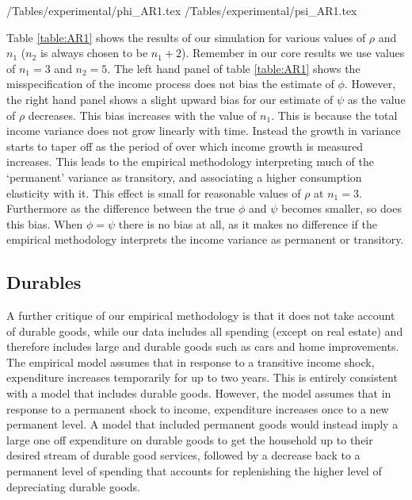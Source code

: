 \documentclass[titlepage]{\econtex}\newcommand{\texname}{IncomeUncertainty}
\begin{document}
\begin{center}
	\econtexRoot/Tables/experimental/phi_AR1.tex	
	\econtexRoot/Tables/experimental/psi_AR1.tex		
	\label{table:AR1}
\end{center}

Table \ref{table:AR1} shows the results of our simulation for various values of $\rho$ and $n_1$ ($n_2$ is always chosen to be $n_1+2$). Remember in our core results we use values of $n_1=3$ and $n_2=5$. The left hand panel of table \ref{table:AR1} shows the misspecification of the income process does not bias the estimate of $\phi$. However, the right hand panel shows a slight upward bias for our estimate of $\psi$ as the value of $\rho$ decreases. This bias increases with the value of $n_1$. This is because the total income variance does not grow linearly with time. Instead the growth in variance starts to taper off as the period of over which income growth is measured increases. This leads to the empirical methodology interpreting much of the `permanent' variance as transitory, and associating a higher consumption elasticity with it. This effect is small for reasonable values of $\rho$ at $n_1=3$. Furthermore as the difference between the true $\phi$ and $\psi$ becomes smaller, so does this bias. When $\phi=\psi$ there is no bias at all, as it makes no difference if the empirical methodology interprets the income variance as permanent or transitory.

\subsection{Durables}
A further critique of our empirical methodology is that it does not take account of durable goods, while our data includes all spending (except on real estate) and therefore includes large and durable goods such as cars and home improvements. The empirical model assumes that in response to a transitive income shock, expenditure increases temporarily for up to two years. This is entirely consistent with a model that includes durable goods. However, the model assumes that in response to a permanent shock to income, expenditure increases once to a new permanent level. A model that included permanent goods would instead imply a large one off expenditure on durable goods to get the household up to their desired stream of durable good services, followed by a decrease back to a permanent level of spending that accounts for replenishing the higher level of depreciating durable goods.
\end{document}
